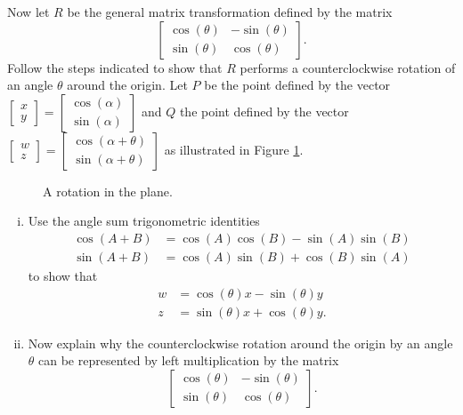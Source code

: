 \begin{pactivity}
\begin{enumerate}[i.]
		\end{enumerate}
	
	\item Now let $R$ be the general matrix transformation defined by the matrix \[\left[\begin{array}{lr} \cos(\theta) & -\sin(\theta) \\ \sin(\theta) & \cos(\theta) \end{array} \right].\] Follow the steps indicated to show that $R$ performs a counterclockwise rotation of an angle $\theta$ around the origin. Let $P$ be the point defined by the vector $\left[ \begin{array}{c} x\\y \end{array} \right] = \left[ \begin{array}{c}\cos(\alpha) \\ \sin(\alpha) \end{array} \right]$ and $Q$ the point defined by the vector $\left[ \begin{array}{c} w\\z \end{array} \right] = \left[ \begin{array}{c} \cos(\alpha+\theta) \\ \sin(\alpha+\theta) \end{array} \right]$ as illustrated in Figure \ref{fig:Rotation_matrix}.
\begin{figure}[h]
\begin{center}
\caption{A rotation in the plane.}
\label{fig:Rotation_matrix}
\end{center}
\end{figure}
		\begin{enumerate}[i.]
		        \item Use the angle sum trigonometric identities 
		        \begin{align*}
		        \cos(A+B) &= \cos(A) \cos(B) - \sin(A) \sin(B) \\
		         \sin(A+B) &= \cos(A) \sin(B) + \cos(B) \sin(A)
		        \end{align*}
		        to show that
    \begin{align*}
    w &= \cos(\theta)x - \sin(\theta)y \\
    z &=  \sin(\theta)x + \cos(\theta)y.
    \end{align*}

	\item Now explain why the counterclockwise rotation around the origin by an angle $\theta$ can be represented by left multiplication by the matrix 
            \[\left[ \begin{array}{rr} \cos(\theta) & -\sin(\theta) \\ \sin(\theta) & \cos(\theta) \end{array} \right].\]
        
	\end{enumerate}
		
	\ea
	
\end{pactivity}


